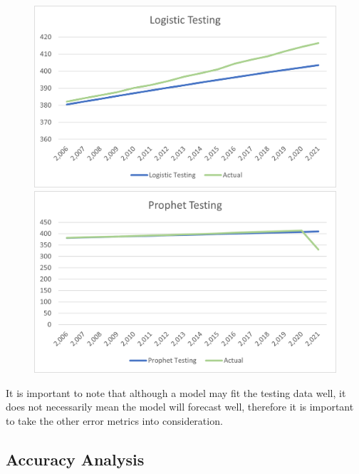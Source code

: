 \documentclass[12pt]{mcmthesis}
\begin{document}
    \begin{figure}
        \centering
        \begin{minipage}{0.5\linewidth}
            \centering
            \includegraphics[width=\textwidth]{logistic_testing}
        \end{minipage}%
        \begin{minipage}{0.5\linewidth}
            \centering
            \includegraphics[width=\textwidth]{prophet_testing}
        \end{minipage}
    \end{figure}


    It is important to note that although a model may fit the testing data well, it does not necessarily mean the model will forecast well, therefore it is important to take the other error metrics into consideration.


    \subsection{Accuracy Analysis}
\end{document}
